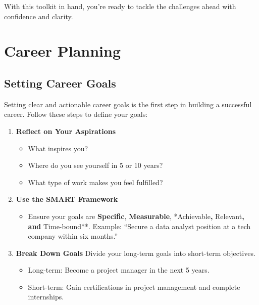 \documentclass[
  letterpaper,
  DIV=11,
  numbers=noendperiod]{scrreprt}
\providecommand{\tightlist}{%
  \setlength{\itemsep}{0pt}\setlength{\parskip}{0pt}}\usepackage{longtable,booktabs,array}
\begin{document}
With this toolkit in hand, you're ready to tackle the challenges ahead
with confidence and clarity.


\chapter{Career Planning}\label{career-planning}

\section{Setting Career Goals}\label{setting-career-goals}

Setting clear and actionable career goals is the first step in building
a successful career. Follow these steps to define your goals:

\begin{enumerate}
\def\labelenumi{\arabic{enumi}.}
\item
  \textbf{Reflect on Your Aspirations}

  \begin{itemize}
  \tightlist
  \item
    What inspires you?
  \item
    Where do you see yourself in 5 or 10 years?
  \item
    What type of work makes you feel fulfilled?
  \end{itemize}
\item
  \textbf{Use the SMART Framework}

  \begin{itemize}
  \tightlist
  \item
    Ensure your goals are \textbf{Specific}, \textbf{Measurable},
    *Achievable\textbf{, }Relevant\textbf{, and }Time-bound**. Example:
    ``Secure a data analyst position at a tech company within six
    months.''
  \end{itemize}
\item
  \textbf{Break Down Goals} Divide your long-term goals into short-term
  objectives.

  \begin{itemize}
  \tightlist
  \item
    Long-term: Become a project manager in the next 5 years.
  \item
    Short-term: Gain certifications in project management and complete
    internships.
  \end{itemize}
\end{enumerate}
\end{document}
